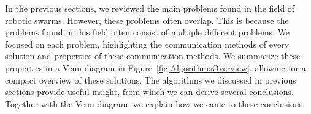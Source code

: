 
In the previous sections, we reviewed the main problems found in the field of robotic swarms. 
However, these problems often overlap.
This is because the problems found in this field often consist of multiple different problems. 
We focused on each problem, highlighting the communication methods of every solution and properties of these communication methods. 
We summarize these properties in a Venn-diagram in Figure~\ref{fig:AlgorithmsOverview}, allowing for a compact overview of these solutions.
The algorithms we discussed in previous sections provide useful insight, from which we can derive several conclusions.
Together with the Venn-diagram, we explain how we came to these conclusions. \\


